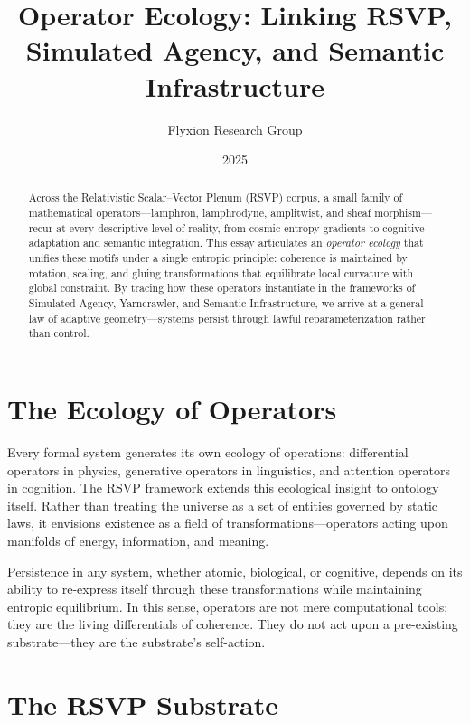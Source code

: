 \documentclass[12pt]{article}
\title{\textbf{Operator Ecology: Linking RSVP, Simulated Agency, and Semantic Infrastructure}}
\author{Flyxion Research Group}
\date{2025}
\begin{document}
\maketitle

\begin{abstract}
Across the Relativistic Scalar--Vector Plenum (RSVP) corpus, a small family of mathematical operators---lamphron, lamphrodyne, amplitwist, and sheaf morphism---recur at every descriptive level of reality, from cosmic entropy gradients to cognitive adaptation and semantic integration. 
This essay articulates an \emph{operator ecology} that unifies these motifs under a single entropic principle: coherence is maintained by rotation, scaling, and gluing transformations that equilibrate local curvature with global constraint.
By tracing how these operators instantiate in the frameworks of Simulated Agency, Yarncrawler, and Semantic Infrastructure, we arrive at a general law of adaptive geometry---systems persist through lawful reparameterization rather than control.
\end{abstract}

\tableofcontents

\newpage

\section{The Ecology of Operators}

Every formal system generates its own ecology of operations: differential operators in physics, generative operators in linguistics, and attention operators in cognition. 
The RSVP framework extends this ecological insight to ontology itself.
Rather than treating the universe as a set of entities governed by static laws, it envisions existence as a field of transformations---operators acting upon manifolds of energy, information, and meaning.

Persistence in any system, whether atomic, biological, or cognitive, depends on its ability to re-express itself through these transformations while maintaining entropic equilibrium.
In this sense, operators are not mere computational tools; they are the living differentials of coherence.
They do not act upon a pre-existing substrate---they are the substrate’s self-action.

\section{The RSVP Substrate}
\end{document}
